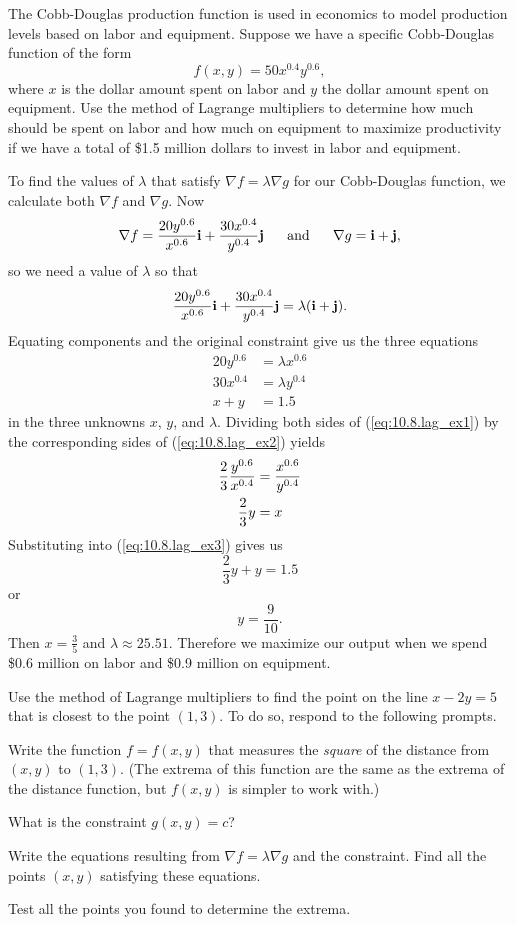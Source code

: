 \begin{exercises} 

\item The Cobb-Douglas production function is used in economics to model production levels based on labor and equipment. Suppose we have a specific Cobb-Douglas function of the form
\[f(x, y) = 50 x^{0.4}y^{0.6},\]
where $x$ is the dollar amount spent on labor and $y$ the dollar amount spent on equipment. Use the method of Lagrange multipliers to determine how much should be spent on labor and how much on equipment to maximize productivity if we have a total of \$1.5 million dollars to invest in labor and equipment. 

\begin{exerciseSolution}
To find the values of $\lambda$ that satisfy $\nabla f = \lambda \nabla g$ for our Cobb-Douglas function, we calculate both $\nabla f$ and $\nabla g$. Now
\[\nabla f = \frac{20y^{0.6}}{x^{0.6}} \mathbf{i} + \frac{30x^{0.4}}{y^{0.4}} \mathbf{j} \ \ \ \ \text{ and } \ \ \ \ \nabla g = \mathbf{i} + \mathbf{j},\]
so we need a value of $\lambda$ so that
\[\frac{20y^{0.6}}{x^{0.6}} \mathbf{i} + \frac{30x^{0.4}}{y^{0.4}} \mathbf{j} = \lambda(\mathbf{i} + \mathbf{j}).\]
Equating components and the original constraint give us the three equations
\begin{align}
20y^{0.6} &= \lambda x^{0.6} \label{eq:10.8.lag_ex1} \\
30x^{0.4} &= \lambda y^{0.4} \label{eq:10.8.lag_ex2} \\
x+y &= 1.5 \label{eq:10.8.lag_ex3}
\end{align}
in the three unknowns $x$, $y$, and $\lambda$. Dividing both sides of (\ref{eq:10.8.lag_ex1}) by the corresponding sides of (\ref{eq:10.8.lag_ex2}) yields
\begin{align}
\frac{2}{3} \frac{y^{0.6}}{x^{0.4}} &= \frac{x^{0.6}}{y^{0.4}} \notag \\
\frac{2}{3} y &= x \label{eq:10.8.lag_ex4}
\end{align}
Substituting into (\ref{eq:10.8.lag_ex3}) gives us
\[\frac{2}{3}y + y = 1.5\]
or
\[y = \frac{9}{10}.\]
Then $x = \frac{3}{5}$ and $\lambda \approx 25.51$. Therefore we maximize our output when we spend \$0.6 million on labor and \$0.9 million on equipment. 

\end{exerciseSolution}

\item Use the method of Lagrange multipliers to find the point on the line 
  $x-2y=5$ that is closest to the point $(1,3)$.  To do so, respond to the following prompts.
  \ba
  \item Write the function $f=f(x,y)$ that measures the {\em square} of
    the distance from $(x,y)$ to $(1,3)$.  (The extrema of this
    function are the same as the extrema of the distance function, but
    $f(x,y)$ is simpler to work with.)
  \item What is the constraint $g(x,y) = c$?
  \item Write the equations resulting from $\nabla f = \lambda \nabla
    g$ and the constraint.  Find all the points
    $(x,y)$ satisfying these equations.
  \item Test all the points you found to determine the extrema.


\end{exercises}
